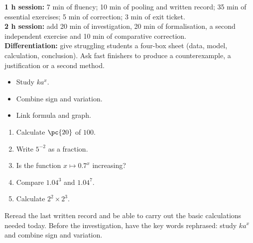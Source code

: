 \ifmxteacher
\begin{method}
\textbf{1 h session:} 7 min of fluency; 10 min of pooling and written record; 35 min of essential exercises; 5 min of correction; 3 min of exit ticket.\\
\textbf{2 h session:} add 20 min of investigation, 20 min of formalisation, a second independent exercise and 10 min of comparative correction.\\
\textbf{Differentiation:} give struggling students a four-box sheet (data, model, calculation, conclusion). Ask fast finishers to produce a counterexample, a justification or a second method.
\end{method}
\fi
{}
\begin{objectives}\begin{itemize}\item Study $ka^x$.\item Combine sign and variation.\item Link formula and graph.\end{itemize}\end{objectives}
\begin{fluency}\begin{enumerate}\item Calculate $\pc{20}$ of $100$. \item Write $5^{-2}$ as a fraction. \item Is the function $x\mapsto\num{0,7}^x$ increasing? \item Compare $\num{1,04}^3$ and $\num{1,04}^7$. \item Calculate $2^2\times2^3$. \end{enumerate}\end{fluency}
\begin{prerequisites}Reread the last written record and be able to carry out the basic calculations needed today. Before the investigation, have the key words rephrased: study $ka^x$ and combine sign and variation.\end{prerequisites}

